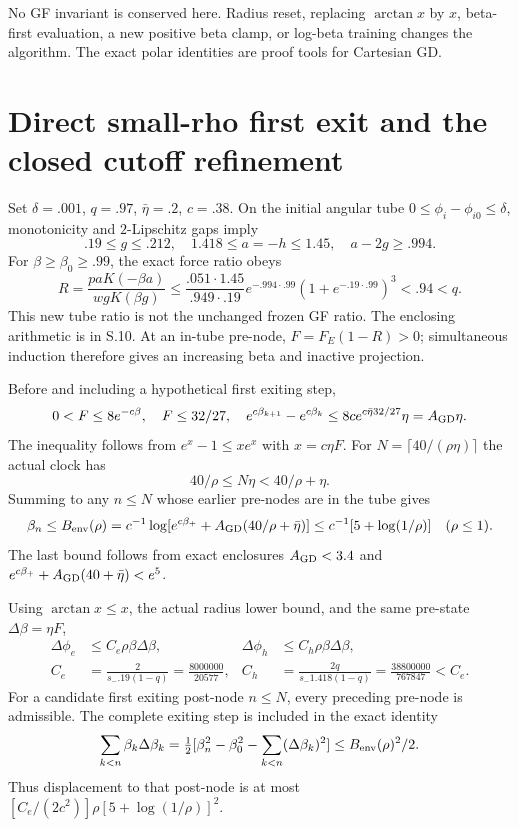\documentclass[11pt,a4paper]{article}
\begin{document}
No GF invariant is conserved here. Radius reset, replacing $\arctan x$ by $x$, beta-first evaluation, a new positive beta clamp, or log-beta training changes the algorithm. The exact polar identities are proof tools for Cartesian GD.

\section{Direct small-rho first exit and the closed cutoff refinement}

Set $\delta=.001$, $q=.97$, $\bar\eta=.2$, $c=.38$. On the initial angular tube $0\le\phi_i-\phi_{i0}\le\delta$, monotonicity and $2$-Lipschitz gaps imply
\[
 .19\le g\le.212,\quad1.418\le a=-h\le1.45,\quad a-2g\ge.994 .
\]
For $\beta\ge\beta_0\ge.99$, the exact force ratio obeys
\[
 R=\frac{paK(-\beta a)}{wgK(\beta g)}
 \le\frac{.051\cdot1.45}{.949\cdot.19}
 e^{-.994\cdot.99}(1+e^{-.19\cdot.99})^3<.94<q .
\]
This new tube ratio is not the unchanged frozen GF ratio. The enclosing arithmetic is in S.10. At an in-tube pre-node, $F=F_E(1-R)>0$; simultaneous induction therefore gives an increasing beta and inactive projection.

Before and including a hypothetical first exiting step,
\[
 0<F\le8e^{-c\beta},\quad F\le32/27,\quad
 e^{c\beta_{k+1}}-e^{c\beta_k}
 \le8c e^{c\bar\eta32/27}\eta=A_{\rm GD}\eta .
\]
The inequality follows from $e^x-1\le xe^x$ with $x=c\eta F$. For $N=\lceil40/(\rho\eta)\rceil$ the actual clock has
\[
 40/\rho\le N\eta<40/\rho+\eta .
\]
Summing to any $n\le N$ whose earlier pre-nodes are in the tube gives
\[
 \beta_n\le B_{\rm env}(\rho)=
 c^{-1}\log[e^{c\beta_+}+A_{\rm GD}(40/\rho+\bar\eta)]
 \le c^{-1}[5+\log(1/\rho)]\quad(\rho\le1).
\]
The last bound follows from exact enclosures $A_{\rm GD}<3.4$ and
$e^{c\beta_+}+A_{\rm GD}(40+\bar\eta)<e^5$.

Using $\arctan x\le x$, the actual radius lower bound, and the same pre-state $\Delta\beta=\eta F$,
\[
\begin{aligned}
 \Delta\phi_e&\le C_e\rho\beta\Delta\beta,&
 \Delta\phi_h&\le C_h\rho\beta\Delta\beta,\\
 C_e&=\frac{2}{s_-.19(1-q)}=\frac{8000000}{20577},&
 C_h&=\frac{2q}{s_-1.418(1-q)}=\frac{38800000}{767847}<C_e .
\end{aligned}
\]
For a candidate first exiting post-node $n\le N$, every preceding pre-node is admissible. The complete exiting step is included in the exact identity
\[
 \sum_{k<n}\beta_k\Delta\beta_k
 =\tfrac12[\beta_n^2-\beta_0^2-\sum_{k<n}(\Delta\beta_k)^2]
 \le B_{\rm env}(\rho)^2/2 .
\]
Thus displacement to that post-node is at most
$[C_e/(2c^2)]\rho[5+\log(1/\rho)]^2$.
\end{document}
